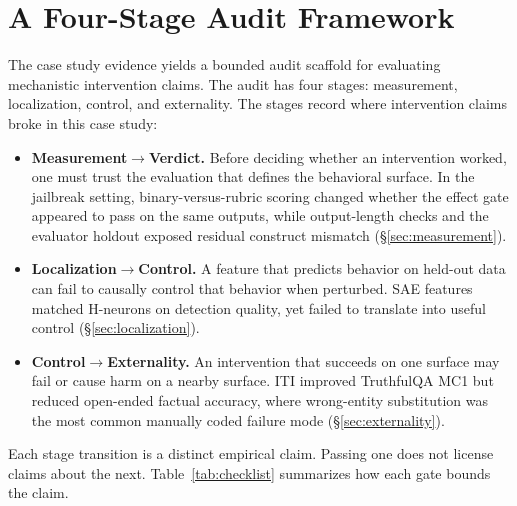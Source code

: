 \documentclass{article}
\begin{document}
\section{A Four-Stage Audit Framework}
\label{sec:framework}

The case study evidence yields a bounded audit scaffold for evaluating mechanistic intervention claims.
The audit has four stages: measurement, localization, control, and externality.
The stages record where intervention claims broke in this case study:

\begin{itemize}
  \item \textbf{Measurement$\to$Verdict.} Before deciding whether an intervention worked, one must trust the evaluation that defines the behavioral surface. In the jailbreak setting, binary-versus-rubric scoring changed whether the effect gate appeared to pass on the same outputs, while output-length checks and the evaluator holdout exposed residual construct mismatch (\S\ref{sec:measurement}).
  \item \textbf{Localization$\to$Control.} A feature that predicts behavior on held-out data can fail to causally control that behavior when perturbed. SAE features matched H-neurons on detection quality, yet failed to translate into useful control (\S\ref{sec:localization}).
  \item \textbf{Control$\to$Externality.} An intervention that succeeds on one surface may fail or cause harm on a nearby surface. ITI improved TruthfulQA MC1 but reduced open-ended factual accuracy, where wrong-entity substitution was the most common manually coded failure mode (\S\ref{sec:externality}).
\end{itemize}

Each stage transition is a distinct empirical claim.
Passing one does not license claims about the next.
Table~\ref{tab:checklist} summarizes how each gate bounds the claim.
\end{document}
